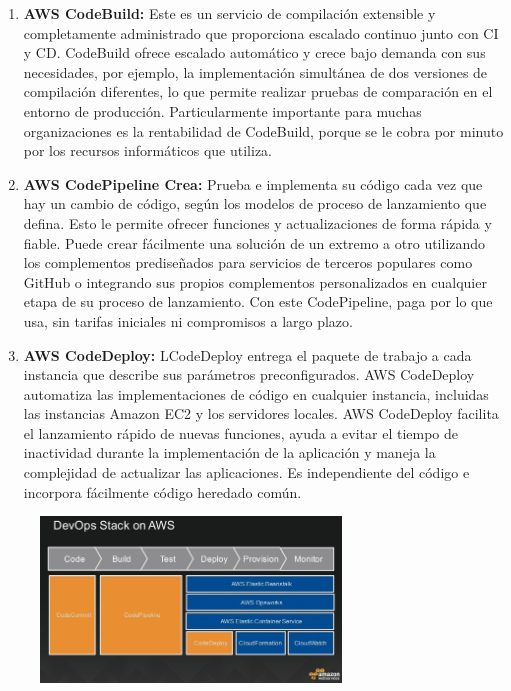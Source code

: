 \documentclass[11pt]{article}
\begin{document}
\begin{enumerate}
    \item \textbf{AWS CodeBuild:} Este es un servicio de compilación extensible y completamente administrado que proporciona escalado continuo junto con CI y CD. CodeBuild ofrece escalado automático y crece bajo demanda con sus necesidades, por ejemplo, la implementación simultánea de dos versiones de compilación diferentes, lo que permite realizar pruebas de comparación en el entorno de producción. Particularmente importante para muchas organizaciones es la rentabilidad de CodeBuild, porque se le cobra por minuto por los recursos informáticos que utiliza.
    \item \textbf{AWS CodePipeline Crea:} Prueba e implementa su código cada vez que hay un cambio de código, según los modelos de proceso de lanzamiento que defina. Esto le permite ofrecer funciones y actualizaciones de forma rápida y fiable. Puede crear fácilmente una solución de un extremo a otro utilizando los complementos prediseñados para servicios de terceros populares como GitHub o integrando sus propios complementos personalizados en cualquier etapa de su proceso de lanzamiento. Con este CodePipeline, paga por lo que usa, sin tarifas iniciales ni compromisos a largo plazo.
\item \textbf{AWS CodeDeploy:} LCodeDeploy entrega el paquete de trabajo a cada instancia que describe sus parámetros preconfigurados. AWS CodeDeploy automatiza las implementaciones de código en cualquier instancia, incluidas las instancias Amazon EC2 y los servidores locales. AWS CodeDeploy facilita el lanzamiento rápido de nuevas funciones, ayuda a evitar el tiempo de inactividad durante la implementación de la aplicación y maneja la complejidad de actualizar las aplicaciones. Es independiente del código e incorpora fácilmente código heredado común.


\end{enumerate}


\begin{figure}[htb]
\begin{center}
\includegraphics[width=8cm]{./images/imagen1.jpg}
\end{center}
\end{figure}
\end{document}
